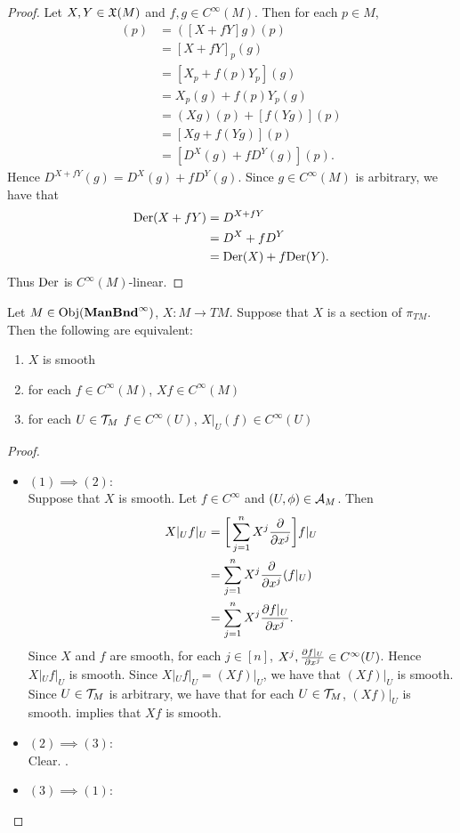 \documentclass{book}
\begin{document}
\begin{proof}
	Let $X, Y \in \mathfrak{X}(M)$ and $f, g \in C^{\infty}(M)$. Then for each $p \in M$,
	\begin{align*}
		[D^{X + f Y}(g)](p)
		& = ([X + f Y]g)(p) \\
		& = [X + f Y]_p(g) \\
		& = [X_p + f(p) Y_p](g) \\
		& = X_p(g) + f(p) Y_p(g) \\
		& = (Xg)(p) + [f (Yg)](p) \\
		& = [Xg + f (Yg)](p) \\
		& = [D^X(g) + f D^Y(g)](p).
	\end{align*}
	Hence $D^{X + f Y}(g) = D^X(g) + f D^Y(g)$. Since $g \in C^{\infty}(M)$ is arbitrary, we have that 
	\begin{align*}
		\text{Der}(X + fY)
		& = D^{X + f Y} \\
		& = D^X + f D^Y \\
		& = \text{Der}(X) + f \text{Der}(Y).
	\end{align*}
	Thus $\text{Der}$ is $C^{\infty}(M)$-linear.
\end{proof}


\begin{ex}
	Let $M \in \operatorname{Obj}(\operatorname*{\text{\textbf{ManBnd}}^{\infty}})$, $X: M \rightarrow TM$. Suppose that $X$ is a section of $\pi_{TM}$. Then the following are equivalent:
	\begin{enumerate}
		\item $X$ is smooth
		\item for each $f \in C^{\infty}(M)$, $Xf \in C^{\infty}(M)$
		\item for each $U \in \mathcal{T}_M$ $f \in C^{\infty}(U)$, $X|_U(f) \in C^{\infty}(U)$
	\end{enumerate}
\end{ex}

\begin{proof}\
	\begin{itemize}
		\item $(1) \implies (2)$: \\
		Suppose that $X$ is smooth. Let $f \in C^{\infty}$ and $(U, \phi) \in \mathcal{A}_M$. Then 
		\begin{align*}
			X|_Uf|_U 
			& = \bigg[ \sum_{j=1}^n X^j \frac{\partial}{\partial x^j} \bigg] f|_U \\
			& = \sum_{j=1}^n X^j \frac{\partial}{\partial x^j}(f|_U) \\
			& = \sum_{j=1}^n X^j \frac{\partial f|_U}{\partial x^j}. 
		\end{align*}
		Since $X$ and $f$ are smooth, for each $j \in [n]$, $X^j, \frac{\partial f|_U}{\partial x^j} \in C^{\infty}(U)$. Hence $X|_Uf|_U$ is smooth. Since $X|_Uf|_U = (Xf)|_U$, we have that $(Xf)|_U$ is smooth. Since $U \in \mathcal{T}_M$ is arbitrary, we have that for each $U \in \mathcal{T}_M$, $(Xf)|_U$ is smooth. \rex{}  implies that $Xf$ is smooth.  
		\item $(2) \implies (3)$: \\
		Clear. .
		\item $(3) \implies (1)$: \\
	\end{itemize}
\end{proof}
\end{document}

